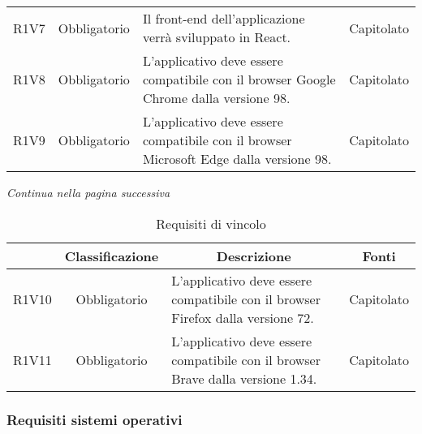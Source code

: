 \begin{table}[H]
\begin{tabular}{c | c | p{6cm} | p{4.1cm}}
        R1V7                                                              & Obbligatorio & Il front-end\glo{} dell'applicazione verrà sviluppato in React\glo{}.                                         & Capitolato               \\
        R1V8                                                              & Obbligatorio & L'applicativo deve essere compatibile con il browser Google Chrome\glo{} dalla versione 98.                   & Capitolato               \\
        R1V9                                                              & Obbligatorio & L'applicativo deve essere compatibile con il browser Microsoft Edge\glo{} dalla versione 98.                  & Capitolato               \\
    \end{tabular}
\end{table}
\begin{center}
    \textit{\small Continua nella pagina successiva}
\end{center}
\begin{table}[H]
    \centering
    \renewcommand{\arraystretch}{1.8}
    \begin{tabular}{c | c | p{6cm} | p{4.1cm}}
        \rowcolor[HTML]{125E28}
        \multicolumn{1}{c}{\color[HTML]{FFFFFF} \textbf{Codice}}            &
        \multicolumn{1}{c}{\color[HTML]{FFFFFF} \textbf{Classificazione}}   &
        \multicolumn{1}{c}{\color[HTML]{FFFFFF} \textbf{Descrizione}}       &
        \multicolumn{1}{c}{\color[HTML]{FFFFFF} \textbf{Fonti}}                                                                                                                                                         \\
        \hline
        R1V10                                                             & Obbligatorio & L'applicativo deve essere compatibile con il browser Firefox\glo{} dalla versione 72.                         & Capitolato   \\
        R1V11                                                             & Obbligatorio & L'applicativo deve essere compatibile con il browser Brave\glo{} dalla versione 1.34.                         & Capitolato   \\
    \end{tabular}
    \caption{Requisiti di vincolo}
\end{table}

\subsubsection{Requisiti sistemi operativi}

